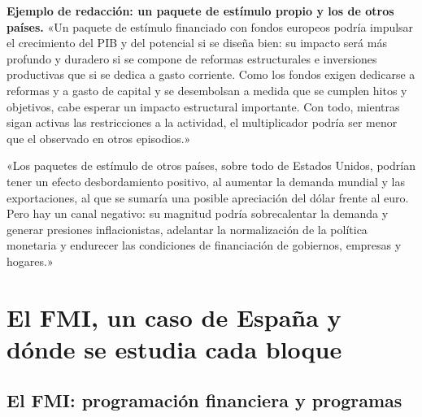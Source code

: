 \documentclass[11pt]{article}
\begin{document}
\begin{anotaciones}
\textbf{Ejemplo de redacción: un paquete de estímulo propio y los de otros países.}
«Un paquete de estímulo financiado con fondos europeos podría impulsar el crecimiento del PIB y del potencial si se diseña bien: su impacto será más profundo y duradero si se compone de reformas estructurales e inversiones productivas que si se dedica a gasto corriente. Como los fondos exigen dedicarse a reformas y a gasto de capital y se desembolsan a medida que se cumplen hitos y objetivos, cabe esperar un impacto estructural importante. Con todo, mientras sigan activas las restricciones a la actividad, el multiplicador podría ser menor que el observado en otros episodios.»

«Los paquetes de estímulo de otros países, sobre todo de Estados Unidos, podrían tener un efecto desbordamiento positivo, al aumentar la demanda mundial y las exportaciones, al que se sumaría una posible apreciación del dólar frente al euro. Pero hay un canal negativo: su magnitud podría sobrecalentar la demanda y generar presiones inflacionistas, adelantar la normalización de la política monetaria y endurecer las condiciones de financiación de gobiernos, empresas y hogares.»
\end{anotaciones}

\section{El FMI, un caso de España y dónde se estudia cada bloque}\label{anexo:fmi}

\subsection{El FMI: programación financiera y programas}\label{anexo:fmi-programacion}
\end{document}
